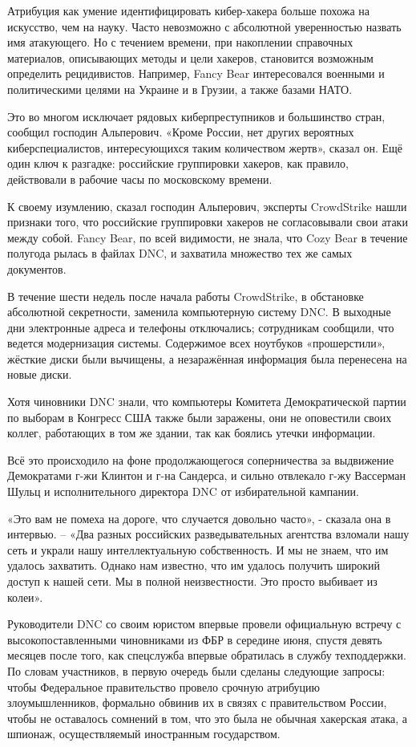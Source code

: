 Атрибуция как умение идентифицировать кибер-хакера больше похожа на
искусство, чем на науку. Часто невозможно с абсолютной уверенностью
назвать имя атакующего. Но с течением времени, при накоплении справочных
материалов, описывающих методы и цели хакеров, становится возможным
определить рецидивистов. Например, Fancy Bear интересовался военными и
политическими целями на Украине и в Грузии, а также базами НАТО.

Это во многом исключает рядовых киберпреступников и большинство стран,
сообщил господин Альперович. «Кроме России, нет других вероятных
киберспециалистов, интересующихся таким количеством жертв», сказал он.
Ещё один ключ к разгадке: российские группировки хакеров, как правило,
действовали в рабочие часы по московскому времени.

К своему изумлению, сказал господин Альперович, эксперты CrowdStrike
нашли признаки того, что российские группировки хакеров не согласовывали
свои атаки между собой. Fancy Bear, по всей видимости, не знала, что
Cozy Bear в течение полугода рылась в файлах DNC, и захватила множество
тех же самых документов.

В течение шести недель после начала работы CrowdStrike, в обстановке
абсолютной секретности, заменила компьютерную систему DNC. В выходные
дни электронные адреса и телефоны отключались; сотрудникам сообщили, что
ведется модернизация системы. Содержимое всех ноутбуков «прошерстили»,
жёсткие диски были вычищены, а незаражённая информация была перенесена
на новые диски.

Хотя чиновники DNC знали, что компьютеры Комитета Демократической партии
по выборам в Конгресс США также были заражены, они не оповестили своих
коллег, работающих в том же здании, так как боялись утечки информации.

Всё это происходило на фоне продолжающегося соперничества за выдвижение
Демократами г-жи Клинтон и г-на Сандерса, и сильно отвлекало г-жу
Вассерман Шульц и исполнительного директора DNC от избирательной
кампании.

«Это вам не помеха на дороге, что случается довольно часто», - сказала
она в интервью. -- «Два разных российских разведывательных агентства
взломали нашу сеть и украли нашу интеллектуальную собственность. И мы не
знаем, что им удалось захватить. Однако нам известно, что им удалось
получить широкий доступ к нашей сети. Мы в полной неизвестности. Это
просто выбивает из колеи».

Руководители DNC со своим юристом впервые провели официальную встречу с
высокопоставленными чиновниками из ФБР в середине июня, спустя девять
месяцев после того, как спецслужба впервые обратилась в службу
техподдержки. По словам участников, в первую очередь были сделаны
следующие запросы: чтобы Федеральное правительство провело срочную
атрибуцию злоумышленников, формально обвинив их в связях с
правительством России, чтобы не оставалось сомнений в том, что это была
не обычная хакерская атака, а шпионаж, осуществляемый иностранным
государством.

